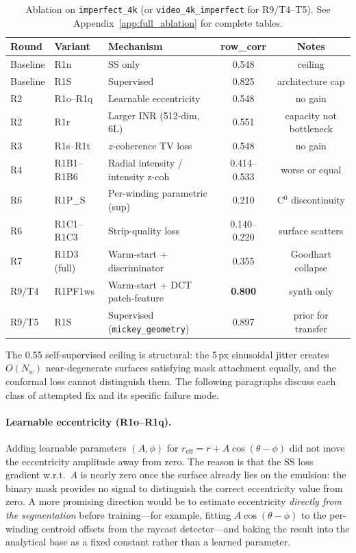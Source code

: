\documentclass[11pt,a4paper]{article}
\begin{document}
\begin{table}[H]
\centering
\small
\begin{tabular}{lllcc}
\toprule
Round & Variant & Mechanism & row\_corr & Notes \\
\midrule
Baseline & R1n & SS only & 0.548 & ceiling \\
Baseline & R1S & Supervised & 0.825 & architecture cap \\
\midrule
R2 & R1o--R1q & Learnable eccentricity & 0.548 & no gain \\
R2 & R1r & Larger INR (512-dim, 6L) & 0.551 & capacity not bottleneck \\
\midrule
R3 & R1s--R1t & $z$-coherence TV loss & 0.548 & no gain \\
\midrule
R4 & R1B1--R1B6 & Radial intensity / intensity z-coh & 0.414--0.533 & worse or equal \\
\midrule
R6 & R1P\_S & Per-winding parametric (sup) & 0.210 & C$^0$ discontinuity \\
R6 & R1C1--R1C3 & Strip-quality loss & 0.140--0.220 & surface scatters \\
\midrule
R7 & R1D3 (full) & Warm-start + discriminator & 0.355 & Goodhart collapse \\
\midrule
R9/T4 & R1PF1ws & Warm-start + DCT patch-feature & \textbf{0.800} & synth only \\
R9/T5 & R1S & Supervised (\texttt{mickey\_geometry}) & 0.897 & prior for transfer \\
\bottomrule
\end{tabular}
\caption{Ablation on \texttt{imperfect\_4k} (or \texttt{video\_4k\_imperfect} for R9/T4--T5). See Appendix~\ref{app:full_ablation} for complete tables.}
\label{tab:ablation_imperfect}
\end{table}

The 0.55 self-supervised ceiling is structural: the 5\,px sinusoidal jitter creates $O(N_w)$ near-degenerate surfaces satisfying mask attachment equally, and the conformal loss cannot distinguish them. The following paragraphs discuss each class of attempted fix and its specific failure mode.

\paragraph{Learnable eccentricity (R1o--R1q).} Adding learnable parameters $(A, \phi)$ for $r_{\text{eff}} = r + A\cos(\theta - \phi)$ did not move the eccentricity amplitude away from zero. The reason is that the SS loss gradient w.r.t.\ $A$ is nearly zero once the surface already lies on the emulsion: the binary mask provides no signal to distinguish the correct eccentricity value from zero. A more promising direction would be to estimate eccentricity \emph{directly from the segmentation} before training—for example, fitting $A\cos(\theta-\phi)$ to the per-winding centroid offsets from the raycast detector—and baking the result into the analytical base as a fixed constant rather than a learned parameter.
\end{document}
